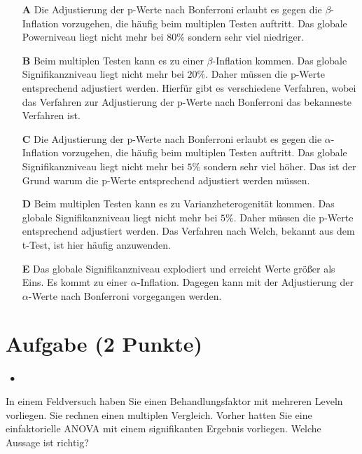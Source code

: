 \documentclass[a4paper, 9pt]{scrartcl}\usepackage[]{graphicx}\usepackage[]{xcolor}
\begin{document}
\begin{enumerate}
\item [\textbf{A} \msquare] Die Adjustierung der p-Werte nach Bonferroni erlaubt es gegen die $\beta$-Inflation vorzugehen, die häufig beim multiplen Testen auftritt. Das globale Powerniveau liegt nicht mehr bei $80\%$ sondern sehr viel niedriger.
\item [\textbf{B} \msquare] Beim multiplen Testen kann es zu einer $\beta$-Inflation kommen. Das globale Signifikanzniveau liegt nicht mehr bei $20\%$. Daher müssen die p-Werte entsprechend adjustiert werden. Hierfür gibt es verschiedene Verfahren, wobei das Verfahren zur Adjustierung der p-Werte nach Bonferroni das bekanneste Verfahren ist.
\item [\textbf{C} \msquare] Die Adjustierung der p-Werte nach Bonferroni erlaubt es gegen die $\alpha$-Inflation vorzugehen, die häufig beim multiplen Testen auftritt. Das globale Signifikanzniveau liegt nicht mehr bei $5\%$ sondern sehr viel höher. Das ist der Grund warum die p-Werte entsprechend adjustiert werden müssen.
\item [\textbf{D} \msquare] Beim multiplen Testen kann es zu Varianzheterogenität kommen. Das globale Signifikanzniveau liegt nicht mehr bei $5\%$. Daher müssen die p-Werte entsprechend adjustiert werden. Das Verfahren nach Welch, bekannt aus dem t-Test, ist hier häufig anzuwenden.
\item [\textbf{E} \msquare] Das globale Signifikanzniveau explodiert und erreicht Werte größer als Eins. Es kommt zu einer $\alpha$-Inflation. Dagegen kann mit der Adjustierung der $\alpha$-Werte nach Bonferroni vorgegangen werden.
\end{enumerate}

\section{Aufgabe \hfill (2 Punkte)}

\ifcollection
\begin{flushright}
\tiny\vspace{-2Ex}
\textbf{\examinhaltstart}
\exammodulestatversuch $\;\bullet$
\exammodulebiostat
\vspace{-1Ex}
\end{flushright}
\fi




In einem Feldversuch haben Sie einen Behandlungsfaktor mit mehreren Leveln vorliegen. Sie rechnen einen multiplen Vergleich. Vorher hatten Sie eine einfaktorielle ANOVA mit einem signifikanten Ergebnis vorliegen. Welche Aussage ist richtig?
\end{document}
